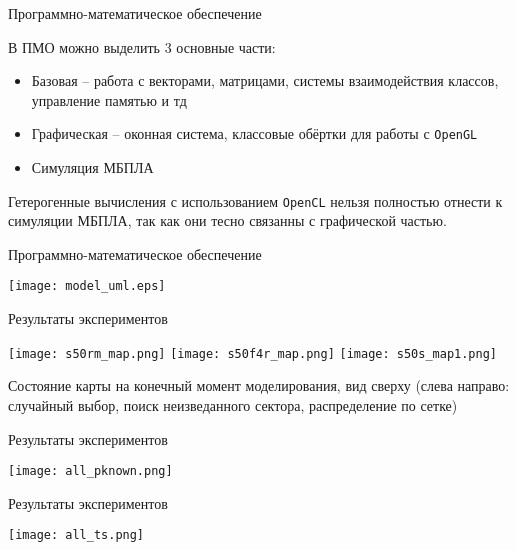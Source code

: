 \begin{tslide}{Программно-математическое обеспечение}

    В ПМО можно выделить 3 основные части:
    \begin{itemize}
        \item Базовая -- работа с векторами, матрицами, системы
    взаимодействия классов, управление памятью и тд

        \item Графическая -- оконная система, классовые обёртки
            для работы с \verb|OpenGL|

        \item Симуляция МБПЛА
    \end{itemize}

    Гетерогенные вычисления с использованием \verb|OpenCL| нельзя
    полностью отнести к симуляции МБПЛА, так как они тесно связанны
    с графической частью.

\end{tslide}

\begin{tslide}{Программно-математическое обеспечение}

    \centering
    \texttt{[image: model\_uml.eps]}

\end{tslide}

\begin{tslide}{Результаты экспериментов}

    \vfill

    \begin{center}
    \texttt{[image: s50rm\_map.png]}
    \texttt{[image: s50f4r\_map.png]}
    \texttt{[image: s50s\_map1.png]}
    \end{center}
    \vfill

    Состояние карты на конечный момент моделирования, вид сверху
    (слева направо: случайный выбор, поиск неизведанного сектора, 
    распределение по сетке)
    \vfill

\end{tslide}

\begin{tslide}{Результаты экспериментов}

    \centering
    \texttt{[image: all\_pknown.png]}
\end{tslide}

\begin{tslide}{Результаты экспериментов}

    \centering
    \texttt{[image: all\_ts.png]}
\end{tslide}


